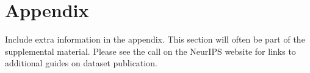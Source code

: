 \section{Appendix}


Include extra information in the appendix. This section will often be part of the supplemental material. Please see the call on the NeurIPS website for links to additional guides on dataset publication.

\begin{enumerate}



\end{enumerate}
